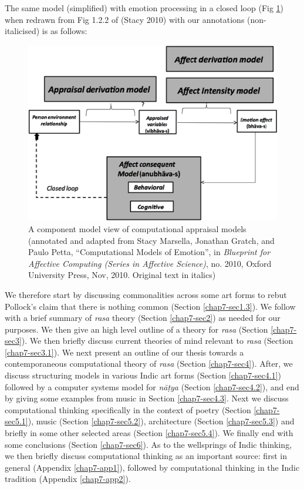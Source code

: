 The same model (simplified) with emotion processing in a closed loop (Fig \ref{chap7-fig2}) when redrawn from Fig 1.2.2 of (Stacy 2010) with our annotations (non-italicised) is as follows:

\begin{figure}[H]
\centering
\includegraphics{figures/4.eps}
\caption{A component model view of computational appraisal models (annotated and adapted from Stacy Marsella, Jonathan Gratch, and Paulo Petta, ``Computational Models of Emotion'', in \textsl{Blueprint for Affective Computing (Series in Affective Science)}, no. 2010, Oxford University Press, Nov, 2010. Original text in italics)}\label{chap7-fig2}
\end{figure}

We therefore start by discussing commonalities across some art forms to rebut Pollock’s claim that there is nothing common (Section \ref{chap7-sec1.3}). We follow with a brief summary of \textsl{rasa} theory (Section \ref{chap7-sec2}) as needed for our purposes. We then give an high level outline of a theory for \textsl{rasa} (Section \ref{chap7-sec3}). We then briefly discuss current theories of mind relevant to \textsl{rasa} (Section \ref{chap7-sec3.1}). We next present an outline of our thesis towards a contemporaneous computational theory of \textsl{rasa} (Section \ref{chap7-sec4}). After, we discuss structuring models in various Indic art forms (Section \ref{chap7-sec4.1}) followed by a computer systems model for \textsl{nāṭya} (Section \ref{chap7-sec4.2}), and end by giving some examples from music in Section \ref{chap7-sec4.3}. Next we discuss computational thinking specifically in the context of poetry (Section \ref{chap7-sec5.1}), music (Section \ref{chap7-sec5.2}), architecture (Section \ref{chap7-sec5.3}) and briefly in some other selected areas (Section \ref{chap7-sec5.4}). We finally end with some conclusions (Section \ref{chap7-sec6}). As to the wellsprings of Indic thinking, we then briefly discuss computational thinking as an important source: first in general (Appendix \ref{chap7-app1}), followed by computational thinking in the Indic tradition (Appendix \ref{chap7-app2}). 

